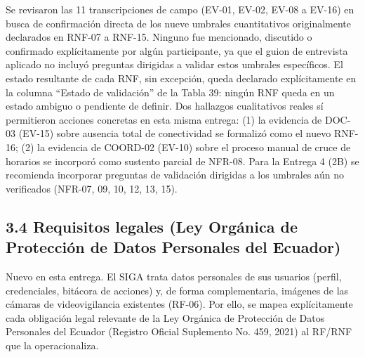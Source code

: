 
Se revisaron las 11 transcripciones de campo (EV-01, EV-02, EV-08 a EV-16) en busca de confirmación directa de los nueve umbrales cuantitativos originalmente declarados en RNF-07 a RNF-15. Ninguno fue mencionado, discutido o confirmado explícitamente por algún participante, ya que el guion de entrevista aplicado no incluyó preguntas dirigidas a validar estos umbrales específicos. El estado resultante de cada RNF, sin excepción, queda declarado explícitamente en la columna ``Estado de validación'' de la Tabla 39: ningún RNF queda en un estado ambiguo o pendiente de definir. Dos hallazgos cualitativos reales sí permitieron acciones concretas en esta misma entrega: (1) la evidencia de DOC-03 (EV-15) sobre ausencia total de conectividad se formalizó como el nuevo RNF-16; (2) la evidencia de COORD-02 (EV-10) sobre el proceso manual de cruce de horarios se incorporó como sustento parcial de NFR-08. Para la Entrega 4 (2B) se recomienda incorporar preguntas de validación dirigidas a los umbrales aún no verificados (NFR-07, 09, 10, 12, 13, 15).

\subsection*{3.4 Requisitos legales (Ley Orgánica de Protección de Datos Personales del Ecuador)}


Nuevo en esta entrega. El SIGA trata datos personales de sus usuarios (perfil, credenciales, bitácora de acciones) y, de forma complementaria, imágenes de las cámaras de videovigilancia existentes (RF-06). Por ello, se mapea explícitamente cada obligación legal relevante de la Ley Orgánica de Protección de Datos Personales del Ecuador (Registro Oficial Suplemento No. 459, 2021) al RF/RNF que la operacionaliza.




